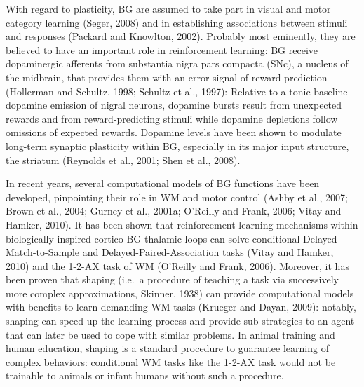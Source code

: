 \documentclass[
  11pt,
  a4paper,
]{scrbook}
\begin{document}
With regard to plasticity, BG are assumed to take part in visual and
motor category learning (Seger, 2008) and in establishing associations
between stimuli and responses (Packard and Knowlton, 2002). Probably
most eminently, they are believed to have an important role in
reinforcement learning: BG receive dopaminergic afferents from
substantia nigra pars compacta (SNc), a nucleus of the midbrain, that
provides them with an error signal of reward prediction (Hollerman and
Schultz, 1998; Schultz et al., 1997): Relative to a tonic baseline
dopamine emission of nigral neurons, dopamine bursts result from
unexpected rewards and from reward-predicting stimuli while dopamine
depletions follow omissions of expected rewards. Dopamine levels have
been shown to modulate long-term synaptic plasticity within BG,
especially in its major input structure, the striatum (Reynolds et al.,
2001; Shen et al., 2008).

In recent years, several computational models of BG functions have been
developed, pinpointing their role in WM and motor control (Ashby et al.,
2007; Brown et al., 2004; Gurney et al., 2001a; O'Reilly and Frank,
2006; Vitay and Hamker, 2010). It has been shown that reinforcement
learning mechanisms within biologically inspired cortico-BG-thalamic
loops can solve conditional Delayed-Match-to-Sample and
Delayed-Paired-Association tasks (Vitay and Hamker, 2010) and the 1-2-AX
task of WM (O'Reilly and Frank, 2006). Moreover, it has been proven that
shaping (i.e.~a procedure of teaching a task via successively more
complex approximations, Skinner, 1938) can provide computational models
with benefits to learn demanding WM tasks (Krueger and Dayan, 2009):
notably, shaping can speed up the learning process and provide
sub-strategies to an agent that can later be used to cope with similar
problems. In animal training and human education, shaping is a standard
procedure to guarantee learning of complex behaviors: conditional WM
tasks like the 1-2-AX task would not be trainable to animals or infant
humans without such a procedure.
\end{document}
